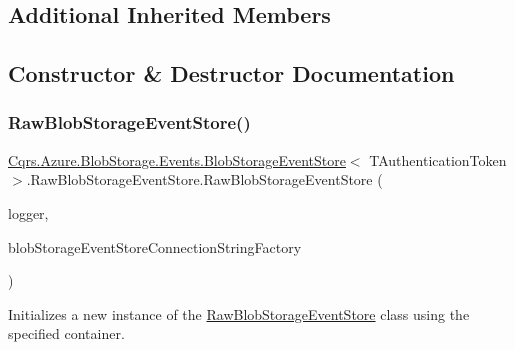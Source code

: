 \subsection*{Additional Inherited Members}


\subsection{Constructor \& Destructor Documentation}
\mbox{\label{classCqrs_1_1Azure_1_1BlobStorage_1_1Events_1_1BlobStorageEventStore_1_1RawBlobStorageEventStore_a42832e52a20eeb7012526624181f457c_a42832e52a20eeb7012526624181f457c}} 
\subsubsection{\texorpdfstring{Raw\+Blob\+Storage\+Event\+Store()}{RawBlobStorageEventStore()}}
{\footnotesize\ttfamily \hyperlink{classCqrs_1_1Azure_1_1BlobStorage_1_1Events_1_1BlobStorageEventStore}{Cqrs.\+Azure.\+Blob\+Storage.\+Events.\+Blob\+Storage\+Event\+Store}$<$ T\+Authentication\+Token $>$.Raw\+Blob\+Storage\+Event\+Store.\+Raw\+Blob\+Storage\+Event\+Store (\begin{DoxyParamCaption}\item[{I\+Logger}]{logger,  }\item[{\hyperlink{interfaceCqrs_1_1Azure_1_1BlobStorage_1_1IBlobStorageStoreConnectionStringFactory}{I\+Blob\+Storage\+Store\+Connection\+String\+Factory}}]{blob\+Storage\+Event\+Store\+Connection\+String\+Factory }\end{DoxyParamCaption})}



Initializes a new instance of the \hyperlink{classCqrs_1_1Azure_1_1BlobStorage_1_1Events_1_1BlobStorageEventStore_1_1RawBlobStorageEventStore}{Raw\+Blob\+Storage\+Event\+Store} class using the specified container. 



